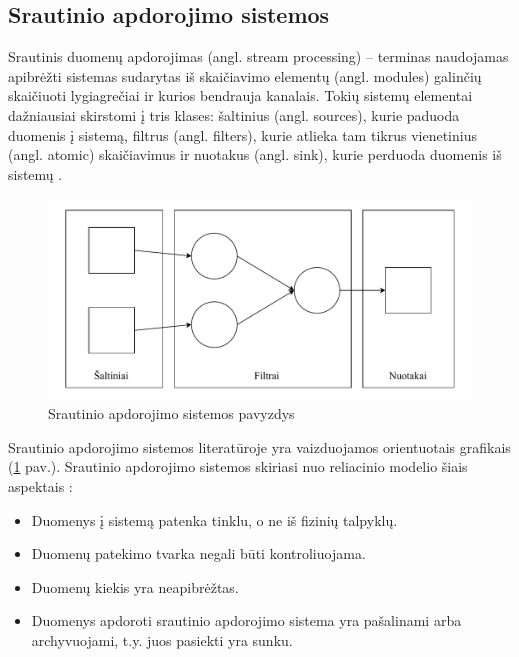 \documentclass{VUMIFPSbakalaurinis}
\begin{document}
\subsection{Srautinio apdorojimo sistemos}
Srautinis duomenų apdorojimas (angl. stream processing) – terminas naudojamas apibrėžti sistemas sudarytas iš skaičiavimo elementų (angl. modules) galinčių skaičiuoti lygiagrečiai ir kurios bendrauja kanalais. Tokių sistemų elementai dažniausiai skirstomi į tris klases: šaltinius (angl. sources), kurie paduoda duomenis į sistemą, filtrus (angl. filters), kurie atlieka tam tikrus vienetinius (angl. atomic) skaičiavimus ir nuotakus (angl. sink), kurie perduoda duomenis iš sistemų \cite{stephens1997survey}. 
\begin{figure}[H]
    \includegraphics[width=15cm]{img/Srautinio apdorojimo sistema.pdf}
    \caption{Srautinio apdorojimo sistemos pavyzdys}
    \label{srautinio–apdorojimo–sistema}
\end{figure} 
Srautinio apdorojimo sistemos literatūroje yra vaizduojamos orientuotais grafikais (\ref{srautinio–apdorojimo–sistema} pav.). Srautinio apdorojimo sistemos skiriasi nuo reliacinio modelio šiais aspektais \cite{babcock2002models}: 
\begin{itemize}
    \item Duomenys į sistemą patenka tinklu, o ne iš fizinių talpyklų.
    \item Duomenų patekimo tvarka negali būti kontroliuojama.
    \item Duomenų kiekis yra neapibrėžtas.
    \item Duomenys apdoroti srautinio apdorojimo sistema yra pašalinami arba archyvuojami, t.y. juos pasiekti yra sunku. 
\end{itemize}
\end{document}
